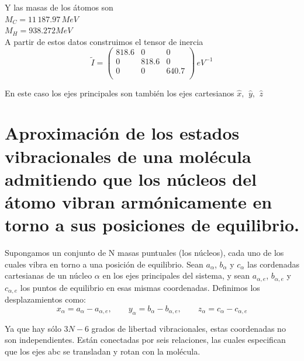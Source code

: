 \documentclass[a4paper]{article}
\begin{document}
 Y las masas de los átomos son\\
 $M_C = 11\, 187.97 \, MeV$\\
 $M_H = 938.272 MeV$\\
 
 A partir de estos datos construimos el tensor de inercia
 $$ \tilde I =
 \begin{pmatrix}
 818.6 & 0 & 0 \\
 0 & 818.6 & 0 \\
 0 & 0 & 640.7\\
 \end{pmatrix}
 \, eV^{-1}
 $$
 
 En este caso los ejes principales son también los ejes cartesianos $ \hat x, \,\ \hat y, \,\ \hat z$
\section{Aproximación de los estados vibracionales de una molécula admitiendo que los núcleos del átomo vibran armónicamente en torno a sus posiciones de equilibrio.}
Supongamos un conjunto de N masas puntuales (los núcleos), cada uno de los cuales vibra en torno a una posición de equilibrio. Sean $a_\alpha$, $b_\alpha$ y $c_\alpha$ las cordenadas cartesianas de un núcleo $\alpha$ en los ejes principales del sistema, y sean $a_{\alpha ,e}$, $b_{\alpha ,e}$ y $c_{\alpha ,e}$ los puntos de equilibrio en esas mismas coordenadas. Definimos los desplazamientos como:
\begin{equation}
x_\alpha = a_\alpha - a_{\alpha, e}, \qquad y_\alpha = b_\alpha - b_{\alpha, e}, \qquad z_\alpha = c_\alpha - c_{\alpha, e}
\end{equation}

Ya que hay sólo $3N-6$ grados de libertad vibracionales, estas coordenadas no son independientes. Están conectadas por seis relaciones, las cuales especifican que los ejes abc se transladan y rotan con la molécula.\\
\end{document}
